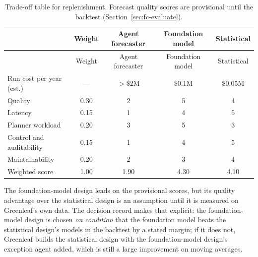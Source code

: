 \begingroup
\small
\begin{longtable}{@{}lcccc@{}}
\caption{Trade-off table for replenishment. Forecast quality scores are provisional until the backtest (Section~\ref{sec:fc-evaluate}).}\label{tab:fc-tradeoff}\\
\toprule
\rowcolor{coHead} & Weight & Agent forecaster & Foundation model & Statistical \\
\midrule
\endfirsthead
\toprule
\rowcolor{coHead} & Weight & Agent forecaster & Foundation model & Statistical \\
\midrule
\endhead
Run cost per year (est.) & --- & $>$\$2M & \$0.1M & \$0.05M \\
\midrule
Quality & 0.30 & 2 & 5 & 4 \\
Latency & 0.15 & 1 & 4 & 5 \\
Planner workload & 0.20 & 3 & 5 & 3 \\
Control and auditability & 0.15 & 1 & 4 & 5 \\
Maintainability & 0.20 & 2 & 3 & 4 \\
\midrule
\rowcolor{coAmberBg} Weighted score & 1.00 & 1.90 & 4.30 & 4.10 \\
\bottomrule
\end{longtable}
\endgroup

The foundation-model design leads on the provisional scores, but its quality advantage over the statistical design is an assumption until it is measured on Greenleaf's own data. The decision record makes that explicit: the foundation-model design is chosen \emph{on condition} that the foundation model beats the statistical design's models in the backtest by a stated margin; if it does not, Greenleaf builds the statistical design with the foundation-model design's exception agent added, which is still a large improvement on moving averages.
